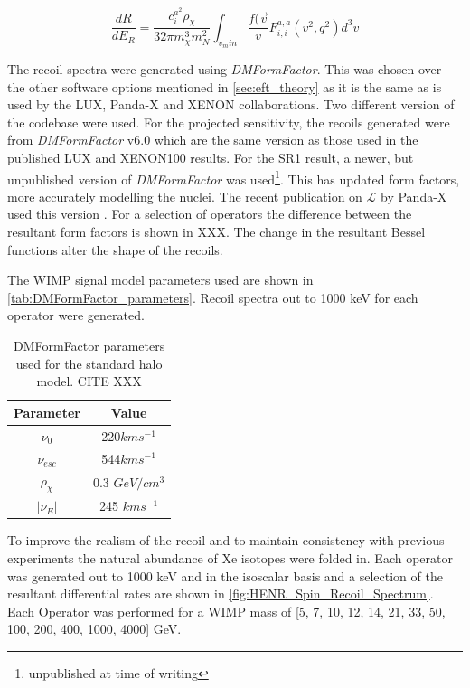 \begin{equation}
    \frac{dR}{dE_R} = \frac{c^{a^2}_i \rho_\chi}{32 \pi m^3_\chi m^2_N} \int_{v_min} \frac{f(\vec{v}}{v} F^{a,a}_{i,i} (v^2, q^2) d^3 v
\end{equation}

\par
The recoil spectra were generated using \textit{DMFormFactor}.
This was chosen over the other software options mentioned in \autoref{sec:eft_theory} as it is the same as is used by the LUX, Panda-X and XENON collaborations.
Two different version of the codebase were used.
For the projected sensitivity, the recoils generated were from \textit{DMFormFactor} v6.0 which are the same version as those used in the published LUX and XENON100 results.
For the SR1 result, a newer, but unpublished version of \textit{DMFormFactor} was used\footnote{unpublished at time of writing}.
This has updated form factors, more accurately modelling the nuclei.
The recent publication on $\mathcal{L}$ by Panda-X used this version \cite{pandax_2_eft_ref}.
For a selection of operators the difference between the resultant form factors is shown in XXX.
The change in the resultant Bessel functions alter the shape of the recoils.

The WIMP signal model parameters used are shown in \autoref{tab:DMFormFactor_parameters}.
Recoil spectra out to 1000 keV for each operator were generated.

\begin{table}[]
    \centering
    \begin{tabular}{c|c}
        Parameter         & Value  \\ \hline
        $\nu_0$           & 220$km s^{-1}$ \\
        $\nu_{esc}$       & 544$km s^{-1}$ \\
        $\rho_{\chi}$     & 0.3 $GeV/cm^{3}$ \\
        $|\nu_E|$         & 245 $km s^{-1}$ 
    \end{tabular}
    \caption{DMFormFactor parameters used for the standard halo model. CITE XXX}
    \label{tab:DMFormFactor_parameters}
\end{table}
To improve the realism of the recoil and to maintain consistency with previous experiments the natural abundance of Xe isotopes were folded in.
Each operator was generated out to 1000 keV and in the isoscalar basis and a selection of the resultant differential rates are shown in \autoref{fig:HENR_Spin_Recoil_Spectrum}.
Each Operator was performed for a WIMP mass of [5, 7, 10, 12, 14, 21, 33, 50, 100, 200, 400, 1000, 4000] GeV.



